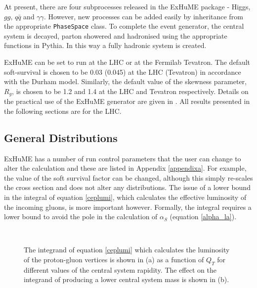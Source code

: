 At present, there are four subprocesses released in the ExHuME package - Higgs, $gg$, $q\bar{q}$ and $\gamma \gamma$. However, new processes can be added easily by inheritance from the appropriate \texttt{PhaseSpace} class. To complete the event generator, the central system is decayed, parton showered and hadronised using the appropriate functions in Pythia. In this way a fully hadronic system is created. 

ExHuME can be set to run at the LHC or at the Fermilab Tevatron. The default soft-survival is chosen to be 0.03 (0.045) at the LHC (Tevatron) in accordance with the Durham model. Similarly, the default value of the skewness parameter, $R_g$, is chosen to be 1.2 and 1.4 at the LHC and Tevatron respectively. Details on the practical use of the ExHuME generator are given in \cite{Monk:2005ji}. All results presented in the following sections are for the LHC. 

\subsection{General Distributions}

ExHuME has a number of run control parameters that the user can change to alter the calculation and these are listed in Appendix \ref{appendixa}. For example, the value of the soft survival factor can be changed, although this simply re-scales the cross section and does not alter any distributions. The issue of a lower bound in the integral of equation \ref{ceplumi}, which calculates the effective luminosity of the incoming gluons, is more important however. Formally, the integral requires a lower bound to avoid the pole in the calculation of $\alpha_S$ (equation \ref{alpha_la}).


\begin{figure} 
\centering
\mbox{
	\quad
	}
\caption[The integrand of equation \ref{ceplumi} as calculated by ExHuME]{The integrand of equation \ref{ceplumi} which calculates the luminosity of the proton-gluon vertices is shown in (a) as a function of $Q_T$ for different values of the central system rapidity. The effect on the integrand of producing a lower central system mass is shown in (b). \label{qtintegrand}}
\end{figure}

